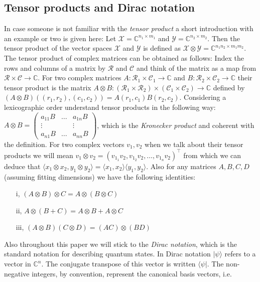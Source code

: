 \subsection{Tensor products and Dirac notation}
In case someone is not familiar with the \textit{tensor product} a short introduction with an example or two is given here: 
Let $\mathcal{X} = \mathbb{C}^{n_1 \times m_1}$ and $\mathcal{Y}= \mathbb{C}^{n_2 \times m_2}$. Then the tensor product of the vector spaces $\mathcal{X}$ and $\mathcal{Y}$ is defined as $\mathcal{X} \otimes \mathcal{Y} = \mathbb{C}^{n_1n_2 \times m_1m_2}$. The tensor product of complex matrices can be obtained as follows: Index the rows and columns of a matrix by $\mathcal{R}$ and $\mathcal{C}$ and think of the matrix as a map from $\mathcal{R} \times \mathcal{C} \rightarrow \mathbb{C}$. For two complex matrices $A: \mathcal{R_1} \times \mathcal{C_1} \rightarrow \mathbb{C}$ and $B: \mathcal{R_2} \times \mathcal{C_2} \rightarrow \mathbb{C}$ their tensor product is the matrix $A \otimes B : (\mathcal{R_1} \times \mathcal{R_2}) \times (\mathcal{C_1} \times \mathcal{C_2})\rightarrow \mathbb{C}$ defined by $(A \otimes B)( (r_1,r_2),(c_1,c_2))= A(r_1,c_1)B(r_2,c_2)$. Considering a lexicographic order understand tensor products in the following way: $A \otimes B = \begin{pmatrix}
a_{11}B & \dots & a_{1n}B \\
\vdots && \vdots \\
a_{n1}B & \dots & a_{nn}B
\end{pmatrix}$, which is the \textit{Kronecker product} and coherent with the definition. For two complex vectors $v_1,v_2$ when we talk about their tensor products we will mean $v_1 \otimes v_2 = ( v_{1_1}v_2, v_{1_2}v_2, \dots , v_{1_n}v_2)^\top$ from which we can deduce that $\langle x_1 \otimes x_2 , y_1 \otimes y_2 \rangle = \langle x_1, x_2 \rangle \langle y_1 , y_2 \rangle$. Also for any matrices $A,B,C,D$ (assuming fitting dimensions) we have the following identities: 
\begin{enumerate}
\item[i,] $(A \otimes B ) \otimes C = A \otimes (B \otimes C) $
\item[ii,] $A \otimes (B + C) = A \otimes B + A \otimes C $
\item[iii,] $(A \otimes B)(C \otimes D) = (AC) \otimes (BD)$
\end{enumerate}
Also throughout this paper we will stick to the \textit{Dirac notation}, which is the standard notation for describing quantum states. In Dirac notation $\vert \psi \rangle$ refers to a vector in $\mathbb{C}^n$. The conjugate transpose of this vector is written $ \langle \psi \vert$. The non-negative integers, by convention, represent the canonical basis vectors, i.e. 
